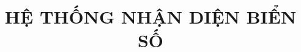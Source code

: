 \documentclass[final]{mobilereport}
\title{HỆ THỐNG NHẬN DIỆN BIỂN SỐ}
\begin{document}
\coverpage%

\frontmatter
\tableofcontents
\clearpage

\mainthesis








\end{document}
